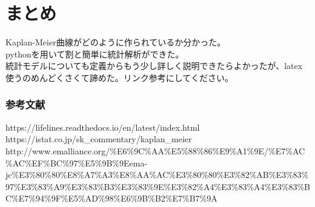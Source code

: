 \documentclass[11pt]{article}
\begin{document}
    \hypertarget{ux307eux3068ux3081}{%
\section{まとめ}\label{ux307eux3068ux3081}}

    Kaplan-Meier曲線がどのように作られているか分かった。\\
pythonを用いて割と簡単に統計解析ができた。\\
統計モデルについても定義からもう少し詳しく説明できたらよかったが、latex使うのめんどくさくて諦めた。リンク参考にしてください。

    \hypertarget{ux53c2ux8003ux6587ux732e}{%
\subsubsection{参考文献}\label{ux53c2ux8003ux6587ux732e}}

https://lifelines.readthedocs.io/en/latest/index.html\\
https://istat.co.jp/sk\_commentary/kaplan\_meier\\
http://www.emalliance.org/\%E6\%9C\%AA\%E5\%88\%86\%E9\%A1\%9E/\%E7\%AC\%AC\%EF\%BC\%97\%E5\%9B\%9Eema-jc\%E3\%80\%80\%E8\%A7\%A3\%E8\%AA\%AC\%E3\%80\%80\%E3\%82\%AB\%E3\%83\%97\%E3\%83\%A9\%E3\%83\%B3\%E3\%83\%9E\%E3\%82\%A4\%E3\%83\%A4\%E3\%83\%BC\%E7\%94\%9F\%E5\%AD\%98\%E6\%9B\%B2\%E7\%B7\%9A


    
    
    
    
\end{document}
